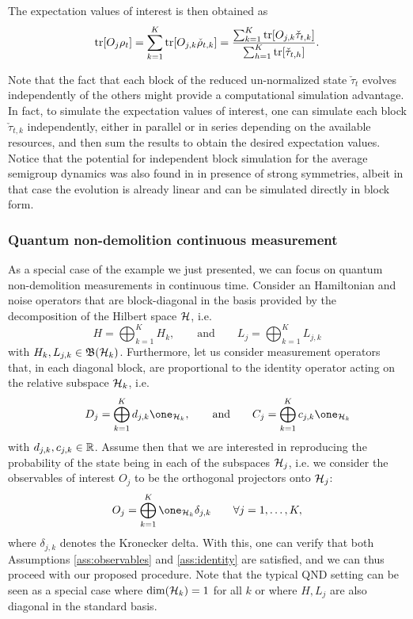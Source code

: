 \documentclass[aihp,12pt]{imsart}
\begin{document}
The expectation values of interest is then obtained as
\[{\rm tr}[O_j \rho_t] = \sum_{k=1}^K{\rm tr}[O_{j,k}\check{\rho}_{t,k}] =  \frac{\sum_{k=1}^K{\rm tr}[O_{j,k}\check{\tau}_{t,k}]}{\sum_{h=1}^K{\rm tr}[\check{\tau}_{t,h}]}. \]

Note that the fact that each block of the reduced un-normalized state $\check{\tau}_t$ evolves independently of the others might provide a computational simulation advantage. In fact, to simulate the expectation values of interest,  one can simulate each block $\check{\tau}_{t,k}$ independently, either in parallel or in series depending on the available resources, and then sum the results to obtain the desired expectation values. Notice that the potential for independent block simulation for the average semigroup dynamics was also found in \cite{prxq2024} in presence of strong symmetries, albeit in that case the evolution is already linear and can be simulated directly in block form. 

\subsubsection{Quantum non-demolition continuous measurement}
As a special case of the example we just presented, we can focus on quantum non-demolition measurements in continuous time.
Consider an Hamiltonian and noise operators that are block-diagonal in the basis provided by the decomposition of the Hilbert space $\mathcal{H}$, i.e. 
\[H= \bigoplus_{k=1}^K H_k, \qquad\text{and}\qquad L_j= \bigoplus_{k=1}^K L_{j,k}\]
with $H_k,L_{j,k}\in\mathfrak{B}(\mathcal{H}_k)$.
Furthermore, let us consider measurement operators that, in each diagonal block, are proportional to the identity operator acting on the relative subspace 
$\mathcal{H}_k$, i.e. 
\[\qquad D_j = \bigoplus_{k=1}^K d_{j,k}\one_{\Hc_{k}}, \qquad\text{and}\qquad C_j = \bigoplus_{k=1}^K c_{j,k} \one_{\Hc_k} \]
with $d_{j,k},c_{j,k}\in\mathbb{R}$.
Assume then that we are interested in reproducing the probability of the state being in each of the subspaces $\mathcal{H}_j$, i.e. we consider the observables of interest $O_j$ to be the orthogonal projectors onto $\mathcal{H}_j$:
\[O_j = \bigoplus_{k=1}^K \one_{\Hc_k}\delta_{j,k}\qquad \forall j=1,\dots,K,\]
where $\delta_{j,k}$ denotes the Kronecker delta.
With this, one can verify that both Assumptions \ref{ass:observables} and \ref{ass:identity} are satisfied, and we can thus proceed with our proposed procedure. 
Note that the typical QND setting \cite{Benoist_2014,LIANG2024111590} can be seen as a special case where $\dim(\mathcal{H}_k)=1$ for all $k$ or where $H, L_j$ are also diagonal in the standard basis.
\end{document}
